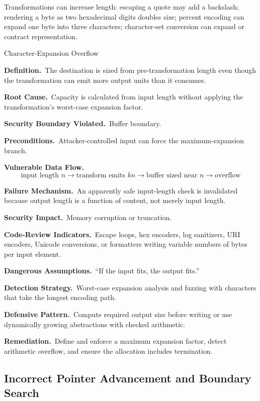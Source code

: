 \documentclass[11pt]{article}
\newcommand{\field}[1]{\par\smallskip\noindent\textbf{#1.}\ }
\begin{document}
Transformations can increase length: escaping a quote may add a backslash; rendering a byte as two hexadecimal digits doubles size; percent encoding can expand one byte into three characters; character-set conversion can expand or contract representation.

\begin{catalogbox}{Character-Expansion Overflow}
\field{Definition}The destination is sized from pre-transformation length even though the transformation can emit more output units than it consumes.

\field{Root Cause}Capacity is calculated from input length without applying the transformation's worst-case expansion factor.

\field{Security Boundary Violated}Buffer boundary.

\field{Preconditions}Attacker-controlled input can force the maximum-expansion branch.

\field{Vulnerable Data Flow}
\[
\text{input length }n \rightarrow \text{transform emits }k n
\rightarrow \text{buffer sized near }n \rightarrow \text{overflow}
\]

\field{Failure Mechanism}An apparently safe input-length check is invalidated because output length is a function of content, not merely input length.

\field{Security Impact}Memory corruption or truncation.

\field{Code-Review Indicators}Escape loops, hex encoders, log sanitizers, URI encoders, Unicode conversions, or formatters writing variable numbers of bytes per input element.

\field{Dangerous Assumptions}``If the input fits, the output fits.''

\field{Detection Strategy}Worst-case expansion analysis and fuzzing with characters that take the longest encoding path.

\field{Defensive Pattern}Compute required output size before writing or use dynamically growing abstractions with checked arithmetic.

\field{Remediation}Define and enforce a maximum expansion factor, detect arithmetic overflow, and ensure the allocation includes termination.
\end{catalogbox}
\clearpage

\subsection{Incorrect Pointer Advancement and Boundary Search}
\end{document}
